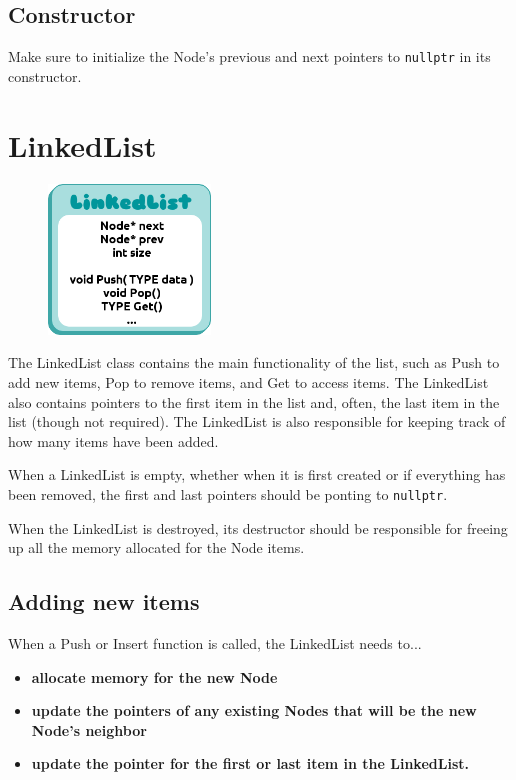 \documentclass[a4paper,12pt,oneside]{book}
\begin{document}
        \subsection{Constructor}
        
        Make sure to initialize the Node's previous and next pointers to
        \texttt{nullptr} in its constructor.
    
    \section{LinkedList}
        
        \begin{figure}
        \includegraphics[height=4cm]{images/justalist.png}
        \end{figure}
        
        The LinkedList class contains the main functionality of the list,
        such as Push to add new items, Pop to remove items, and Get to access items.
        The LinkedList also contains pointers to the first item in the list and,
        often, the last item in the list (though not required).
        The LinkedList is also responsible for keeping track of how many items
        have been added.

        When a LinkedList is empty, whether when it is first created or if everything
        has been removed, the first and last pointers should be ponting to
        \texttt{nullptr}.
        
        When the LinkedList is destroyed, its destructor should be responsible
        for freeing up all the memory allocated for the Node items.

    \subsection{Adding new items}
    
        When a Push or Insert function is called, the LinkedList needs to...
        
        \begin{itemize}
            \item \textbf{allocate memory for the new Node}
            \item \textbf{update the pointers of any existing Nodes that will be the new Node's neighbor}
            \item \textbf{update the pointer for the first or last item in the LinkedList.}
        \end{itemize}
    
\end{document}
